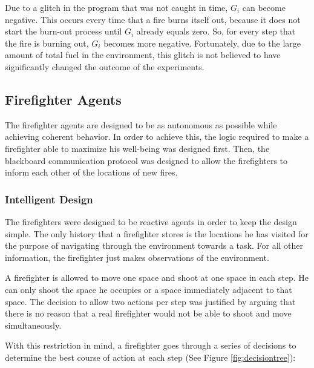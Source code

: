 \documentclass{article}
\begin{document}
  Due to a glitch in the program that was not caught in time, $G_i$ can become
  negative.  This occurs every time that a fire burns itself out, because it
  does not start the burn-out process until $G_i$ already equals zero.  So,
  for every step that the fire is burning out, $G_i$ becomes more negative.
  Fortunately, due to the large amount of total fuel in the environment, this
  glitch is not believed to have significantly changed the outcome of the
  experiments.

  \subsection{Firefighter Agents}

  The firefighter agents are designed to be as autonomous as possible while
  achieving coherent behavior.  In order to achieve this, the logic required
  to make a firefighter able to maximize his well-being was designed first.
  Then, the blackboard communication protocol was designed to allow the
  firefighters to inform each other of the locations of new fires.

  \subsubsection*{Intelligent Design}

  The firefighters were designed to be reactive agents in order to keep the
  design simple.  The only history that a firefighter stores is the locations
  he has visited for the purpose of navigating through the environment towards
  a task.  For all other information, the firefighter just makes observations of the
  environment.

  A firefighter is allowed to move one space and shoot at one space in each
  step.  He can only shoot the space he occupies or a space immediately
  adjacent to that space.  The decision to allow two actions per step was
  justified by arguing that there is no reason that a real firefighter would
  not be able to shoot and move simultaneously.

  With this restriction in mind, a firefighter goes through a series of
  decisions to determine the best course of action at each step (See
  Figure \ref{fig:decisiontree}):
\end{document}
